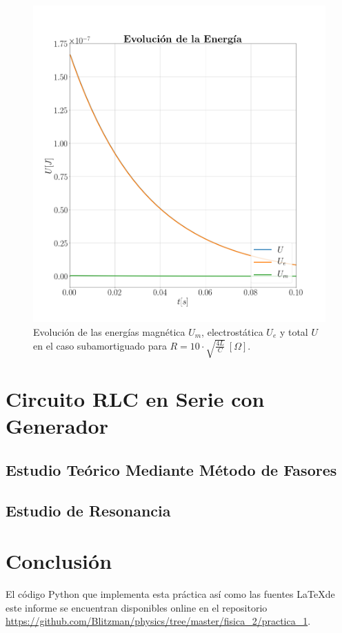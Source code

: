 \documentclass[journal]{IEEEtran}
\begin{document}
\begin{figure}[!htb]
    \centering
    \includegraphics[width=\linewidth,trim={40 70 70 70},clip]{energiasobreamortiguado.png}
    \caption{Evolución de las energías magnética $U_m$, electrostática $U_e$ y total $U$ en el caso subamortiguado para $R=10 \cdot\sqrt{\frac{4L}{C}}~[\Omega]$.}
    \label{fig:intensidadamortiguado}
\end{figure}

\section{Circuito RLC en Serie con Generador}
\label{sec:rlccongenerador}

\subsection{Estudio Teórico Mediante Método de Fasores}
\label{subsec:estudioteorico}

\subsection{Estudio de Resonancia}
\label{subsec:estudioresonancia}

\section{Conclusión}
\label{sec:conclusion}

\clearpage

El código Python que implementa esta práctica así como las fuentes \LaTeX de este informe se encuentran disponibles online en el repositorio \url{https://github.com/Blitzman/physics/tree/master/fisica_2/practica_1}.
\end{document}
